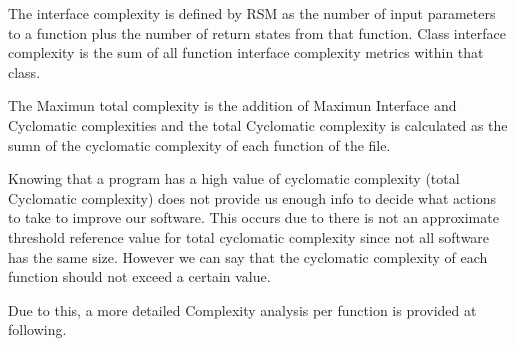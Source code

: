 The interface complexity is defined by RSM as the number of input parameters to a function plus the number of return states from that function. Class interface complexity is the sum of all function interface complexity metrics within that class.

The Maximun total complexity is the addition of Maximun Interface and Cyclomatic complexities and the total Cyclomatic complexity is calculated as the sumn of the cyclomatic complexity of each function of the file. 

Knowing that a program has a high value of cyclomatic complexity (total Cyclomatic complexity) does not provide us enough info to decide what actions to take to improve our software. This occurs due to there is not an approximate threshold reference value for total cyclomatic complexity since not all software has the same size. However we can say that the cyclomatic complexity of each function should not exceed a certain value.

Due to this, a more detailed Complexity analysis per function is provided at following.

